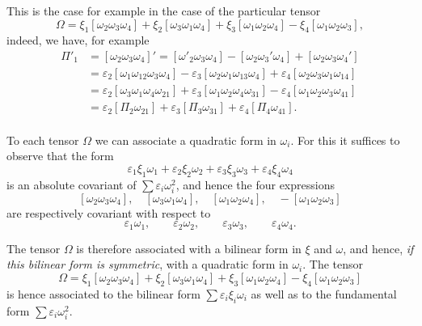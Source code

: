 \documentclass[leqno,12pt]{article}
\makeatletter
\let\old@epsilon\epsilon
\let\old@varepsilon\varepsilon
\let\epsilon\old@varepsilon
\let\varepsilon\old@epsilon
\theoremstyle{shape1}
\theoremstyle{shape0}
\theoremstyle{shape2}
\theoremstyle{definition}
\makeatother
\begin{document}
This is the case for example in the case of the particular tensor
\[
\Omega=\xi_{1}[\omega_{2}\omega_{3}\omega_{4}]+\xi_{2}[\omega_{3}\omega_{1}\omega_{4}]+\xi_{3}[\omega_{1}\omega_{2}\omega_{4}]-\xi_{4}[\omega_{1}\omega_{2}\omega_{3}],
\]
indeed, we have, for example
\begin{align*}  
  \Pi'_{1}&=[\omega_{2}\omega_{3}\omega_{4}]'=[\omega'_{2}\omega_{3}\omega_{4}]-[\omega_{2}\omega_{3}'\omega_{4}]+[\omega_{2}\omega_{3}\omega_{4}']\\
  &=\epsilon_{2}[\omega_{1}\omega_{12}\omega_{3}\omega_{4}]-\epsilon_{3}[\omega_{2}\omega_{1}\omega_{13}\omega_{4}]+\epsilon_{4}[\omega_{2}\omega_{3}\omega_{1}\omega_{14}]\\
  &=\epsilon_{2}[\omega_{3}\omega_{1}\omega_{4}\omega_{21}]+\epsilon_{3}[\omega_{1}\omega_{2}\omega_{4}\omega_{31}]-\epsilon_{4}[\omega_{1}\omega_{2}\omega_{3}\omega_{41}]\\
  &=\epsilon_{2}[\Pi_{2}\omega_{21}]+\epsilon_{3}[\Pi_{3}\omega_{31}]+\epsilon_{4}[\Pi_{4}\omega_{41}].
\end{align*}


\paragraph{}
\label{sec:37}
To each tensor $\Omega$ we can associate a quadratic form in $\omega_{i}$. For this it suffices to observe that the form
\[
\epsilon_{1}\xi_{1}\omega_{1}+\epsilon_{2}\xi_{2}\omega_{2}+\epsilon_{3}\xi_{3}\omega_{3}+\epsilon_{4}\xi_{4}\omega_{4}
\]
is an absolute covariant of $\sum\epsilon_{i}\omega_{i}^{2}$, and hence the four expressions
\[
[\omega_{2}\omega_{3}\omega_{4}],\quad[\omega_{3}\omega_{1}\omega_{4}],\quad[\omega_{1}\omega_{2}\omega_{4}],\quad-[\omega_{1}\omega_{2}\omega_{3}]
\]
are respectively covariant with respect to
\[
\epsilon_{1}\omega_{1},\qquad\epsilon_{2}\omega_{2},\qquad\epsilon_{3}\omega_{3},\qquad\epsilon_{4}\omega_{4}.
\]

The tensor $\Omega$ is therefore associated with a bilinear form in $\xi$ and $\omega$, and hence, \emph{if this bilinear form is symmetric}, with a quadratic form in $\omega_{i}$. The tensor
\[
\Omega=\xi_{1}[\omega_{2}\omega_{3}\omega_{4}]+\xi_{2}[\omega_{3}\omega_{1}\omega_{4}]+\xi_{3}[\omega_{1}\omega_{2}\omega_{4}]-\xi_{4}[\omega_{1}\omega_{2}\omega_{3}]
\]
is hence associated to the bilinear form $\sum\epsilon_{i}\xi_{i}\omega_{i}$ as well as to the fundamental form $\sum\epsilon_{i}\omega_{i}^{2}$.
\end{document}
